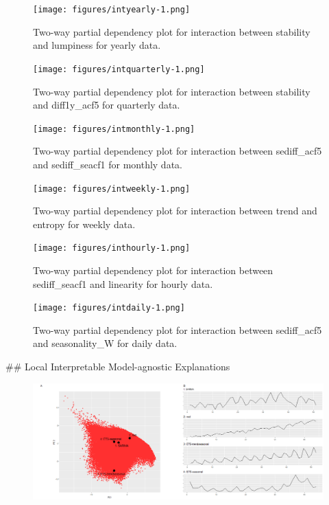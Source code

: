 \documentclass[11pt,a4paper,]{article}
\begin{document}
\begin{figure}
\centering
\texttt{[image: figures/intyearly-1.png]}
\caption{\label{fig:intyearly}Two-way partial dependency plot for
interaction between stability and lumpiness for yearly data.}
\end{figure}

\begin{figure}
\centering
\texttt{[image: figures/intquarterly-1.png]}
\caption{\label{fig:intquarterly}Two-way partial dependency plot for
interaction between stability and diff1y\_acf5 for quarterly data.}
\end{figure}

\begin{figure}
\centering
\texttt{[image: figures/intmonthly-1.png]}
\caption{\label{fig:intmonthly}Two-way partial dependency plot for
interaction between sediff\_acf5 and sediff\_seacf1 for monthly data.}
\end{figure}

\begin{figure}
\centering
\texttt{[image: figures/intweekly-1.png]}
\caption{\label{fig:intweekly}Two-way partial dependency plot for
interaction between trend and entropy for weekly data.}
\end{figure}

\begin{figure}
\centering
\texttt{[image: figures/inthourly-1.png]}
\caption{\label{fig:inthourly}Two-way partial dependency plot for
interaction between sediff\_seacf1 and linearity for hourly data.}
\end{figure}

\begin{figure}
\centering
\texttt{[image: figures/intdaily-1.png]}
\caption{\label{fig:intdaily}Two-way partial dependency plot for interaction
between sediff\_acf5 and seasonality\_W for daily data.}
\end{figure}

\clearpage
\#\# Local Interpretable Model-agnostic Explanations

\begin{figure}[h]

{\centering \includegraphics{figures/quarterlylime-1} 

}

\end{figure}
\end{document}
